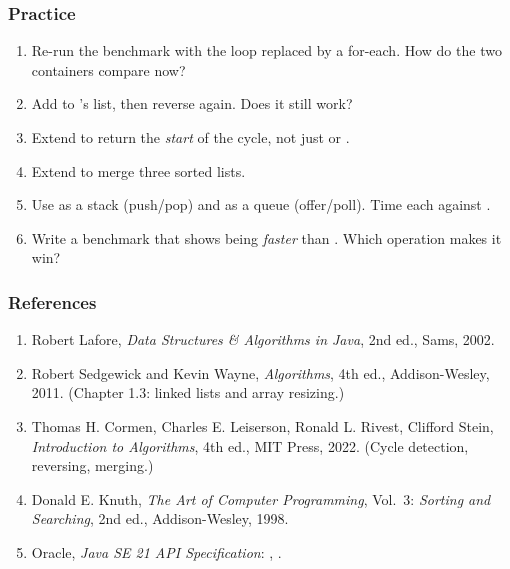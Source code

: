 \documentclass[aspectratio=169,10pt,compress]{beamer}
\begin{document}
\begin{frame}[t,fragile] \frametitle{Practice}
  \begin{enumerate}\small
    \item Re-run the benchmark with the loop replaced by a for-each.
          How do the two containers compare now?
    \item Add  to 's list, then
          reverse again. Does it still work?
    \item Extend  to return the \emph{start} of the
          cycle, not just  or .
    \item Extend  to merge three sorted lists.
    \item Use  as a stack (push/pop) and as a queue
          (offer/poll). Time each against .
    \item Write a benchmark that shows  being
          \emph{faster} than . Which operation
          makes it win?
  \end{enumerate}
\end{frame}




\begin{frame}[t,fragile] \frametitle{References}
  \begin{enumerate}\small
    \item Robert Lafore, \emph{Data Structures \& Algorithms in Java},
          2nd ed., Sams, 2002.
    \item Robert Sedgewick and Kevin Wayne, \emph{Algorithms},
          4th ed., Addison-Wesley, 2011. (Chapter 1.3: linked lists
          and array resizing.)
    \item Thomas H. Cormen, Charles E. Leiserson, Ronald L. Rivest,
          Clifford Stein, \emph{Introduction to Algorithms}, 4th ed.,
          MIT Press, 2022. (Cycle detection, reversing, merging.)
    \item Donald E. Knuth, \emph{The Art of Computer Programming},
          Vol.~3: \emph{Sorting and Searching}, 2nd ed.,
          Addison-Wesley, 1998.
    \item Oracle, \emph{Java SE 21 API Specification}:
          ,
          .
  \end{enumerate}
\end{frame}




\begin{frame}[t,fragile]
  \begin{center}
    \vspace{4cm}
  \end{center}
\end{frame}
\end{document}
